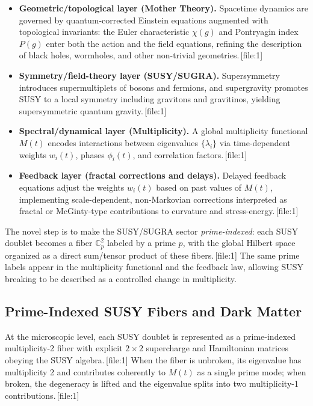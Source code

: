 \documentclass[11pt]{article}
\begin{document}
\begin{itemize}
  \item \textbf{Geometric/topological layer (Mother Theory).} Spacetime dynamics are governed by quantum-corrected Einstein equations augmented with topological invariants: the Euler characteristic \(\chi(g)\) and Pontryagin index \(P(g)\) enter both the action and the field equations, refining the description of black holes, wormholes, and other non-trivial geometries.\,[file:1]
  \item \textbf{Symmetry/field-theory layer (SUSY/SUGRA).} Supersymmetry introduces supermultiplets of bosons and fermions, and supergravity promotes SUSY to a local symmetry including gravitons and gravitinos, yielding supersymmetric quantum gravity.\,[file:1]
  \item \textbf{Spectral/dynamical layer (Multiplicity).} A global multiplicity functional \(M(t)\) encodes interactions between eigenvalues \(\{\lambda_i\}\) via time-dependent weights \(w_i(t)\), phases \(\phi_i(t)\), and correlation factors.\,[file:1]
  \item \textbf{Feedback layer (fractal corrections and delays).} Delayed feedback equations adjust the weights \(w_i(t)\) based on past values of \(M(t)\), implementing scale-dependent, non-Markovian corrections interpreted as fractal or McGinty-type contributions to curvature and stress-energy.\,[file:1]
\end{itemize}

The novel step is to make the SUSY/SUGRA sector \emph{prime-indexed}: each SUSY doublet becomes a fiber \(\mathbb{C}_p^2\) labeled by a prime \(p\), with the global Hilbert space organized as a direct sum/tensor product of these fibers.\,[file:1] The same prime labels appear in the multiplicity functional and the feedback law, allowing SUSY breaking to be described as a controlled change in multiplicity.

\subsection{Prime-Indexed SUSY Fibers and Dark Matter}

At the microscopic level, each SUSY doublet is represented as a prime-indexed multiplicity-2 fiber with explicit \(2\times 2\) supercharge and Hamiltonian matrices obeying the SUSY algebra.\,[file:1] When the fiber is unbroken, its eigenvalue has multiplicity 2 and contributes coherently to \(M(t)\) as a single prime mode; when broken, the degeneracy is lifted and the eigenvalue splits into two multiplicity-1 contributions.\,[file:1]
\end{document}
